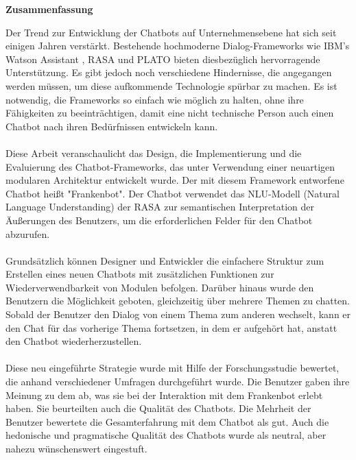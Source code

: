\thispagestyle{empty}
\vspace*{0.2cm}

\begin{center}
    \textbf{Zusammenfassung}
\end{center}

\vspace*{0.2cm}

\noindent 
Der Trend zur Entwicklung der Chatbots auf Unternehmensebene hat sich seit einigen Jahren verstärkt. Bestehende hochmoderne Dialog-Frameworks wie IBM's Watson Assistant \cite{ibmwatson}, RASA \cite{rasa} und PLATO \cite{plato} bieten diesbezüglich hervorragende Unterstützung. Es gibt jedoch noch verschiedene Hindernisse, die angegangen werden müssen, um diese aufkommende Technologie spürbar zu machen. Es ist notwendig, die Frameworks so einfach wie möglich zu halten, ohne ihre Fähigkeiten zu beeinträchtigen, damit eine nicht technische Person auch einen Chatbot nach ihren Bedürfnissen entwickeln kann.
\\~\\
Diese Arbeit veranschaulicht das Design, die Implementierung und die Evaluierung des Chatbot-Frameworks, das unter Verwendung einer neuartigen modularen Architektur entwickelt wurde. Der mit diesem Framework entworfene Chatbot heißt "Frankenbot". Der Chatbot verwendet das NLU-Modell (Natural Language Understanding) der RASA zur semantischen Interpretation der Äußerungen des Benutzers, um die erforderlichen Felder für den Chatbot abzurufen.
\\~\\
Grundsätzlich können Designer und Entwickler die einfachere Struktur zum Erstellen eines neuen Chatbots mit zusätzlichen Funktionen zur Wiederverwendbarkeit von Modulen befolgen. Darüber hinaus wurde den Benutzern die Möglichkeit geboten, gleichzeitig über mehrere Themen zu chatten. Sobald der Benutzer den Dialog von einem Thema zum anderen wechselt, kann er den Chat für das vorherige Thema fortsetzen, in dem er aufgehört hat, anstatt den Chatbot wiederherzustellen.
\\~\\
Diese neu eingeführte Strategie wurde mit Hilfe der Forschungsstudie bewertet, die anhand verschiedener Umfragen durchgeführt wurde. Die Benutzer gaben ihre Meinung zu dem ab, was sie bei der Interaktion mit dem Frankenbot erlebt haben. Sie beurteilten auch die Qualität des Chatbots. Die Mehrheit der Benutzer bewertete die Gesamterfahrung mit dem Chatbot als gut. Auch die hedonische und pragmatische Qualität des Chatbots wurde als neutral, aber nahezu wünschenswert eingestuft.